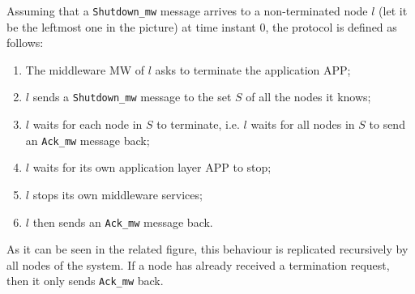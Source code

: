 Assuming that a \texttt{Shutdown\_mw} message arrives to a non-terminated node
$l$ (let it be the leftmost one in the picture) at time instant $0$, the
protocol is defined as follows:

\begin{enumerate}
\item The middleware MW of $l$ asks to terminate the application APP;
\item $l$ sends a \texttt{Shutdown\_mw} message to the set
  $S$ of all the nodes it knows;
\item $l$ waits for each node in $S$ to terminate, i.e. $l$ waits for all
  nodes in $S$ to send an \texttt{Ack\_mw} message back;
\item $l$ waits for its own application layer APP to stop;
\item $l$ stops its own middleware services;
\item $l$ then sends an \texttt{Ack\_mw} message back.
\end{enumerate}

As it can be seen in the related figure, this behaviour is replicated
recursively by all nodes of the system. If a node has already received a
termination request, then it only sends \texttt{Ack\_mw} back.
